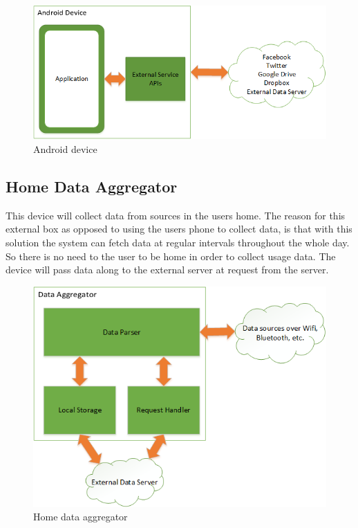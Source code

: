 \begin{figure}[H]
\includegraphics[width=\textwidth]{ch/projectPlan/fig/androidDevice.png}
\caption{Android device}
\end{figure}

\subsection{Home Data Aggregator}
This device will collect data from sources in the users home. The reason for this external box as opposed to using the users phone to collect data, is that with this solution the system can fetch data at regular intervals throughout the whole day. So there is no need to the user to be home in order to collect usage data. The device will pass data along to the external server at request from the server.

\begin{figure}[H]
\includegraphics[width=\textwidth]{ch/projectPlan/fig/home.png}
\caption{Home data aggregator}
\end{figure}
